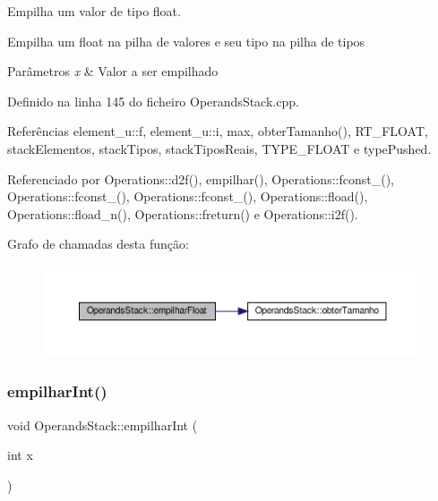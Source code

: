 Empilha um valor de tipo float. 

Empilha um float na pilha de valores e seu tipo na pilha de tipos


\begin{DoxyParams}{Parâmetros}
{\em x} & Valor a ser empilhado \\
\hline
\end{DoxyParams}


Definido na linha 145 do ficheiro Operands\+Stack.\+cpp.



Referências element\+\_\+u\+::f, element\+\_\+u\+::i, max, obter\+Tamanho(), R\+T\+\_\+\+F\+L\+O\+AT, stack\+Elementos, stack\+Tipos, stack\+Tipos\+Reais, T\+Y\+P\+E\+\_\+\+F\+L\+O\+AT e type\+Pushed.



Referenciado por Operations\+::d2f(), empilhar(), Operations\+::fconst\+\_(), Operations\+::fconst\+\_(), Operations\+::fconst\+\_(), Operations\+::fload(), Operations\+::fload\+\_\+n(), Operations\+::freturn() e Operations\+::i2f().

Grafo de chamadas desta função\+:\nopagebreak
\begin{figure}[H]
\begin{center}
\leavevmode
\includegraphics[width=350pt]{classOperandsStack_aeed478b52748b87ac85db261332b633b_cgraph}
\end{center}
\end{figure}
\mbox{\label{classOperandsStack_a5006a59c2d815e4a24b055e2e4d2e741}} 
\subsubsection{\texorpdfstring{empilhar\+Int()}{empilharInt()}}
{\footnotesize\ttfamily void Operands\+Stack\+::empilhar\+Int (\begin{DoxyParamCaption}\item[{int}]{x }\end{DoxyParamCaption})}



